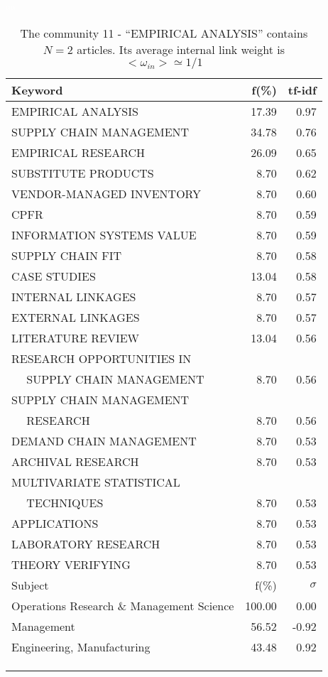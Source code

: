 \documentclass[a4paper,11pt]{report}
\begin{document}
\begin{landscape}
\begin{table}[!ht]
\caption{The community 11 - ``EMPIRICAL ANALYSIS'' contains $N = 2$ articles. Its average internal link weight is $<\omega_{in}> \simeq 1/1$ }
\textcolor{white}{aa}\\
{\scriptsize\begin{tabular}{|l r  r|}
\hline
Keyword & f(\%) & tf-idf \\
\hline
EMPIRICAL ANALYSIS & 17.39 & 0.97\\
SUPPLY CHAIN MANAGEMENT & 34.78 & 0.76\\
EMPIRICAL RESEARCH & 26.09 & 0.65\\
SUBSTITUTE PRODUCTS & 8.70 & 0.62\\
VENDOR-MANAGED INVENTORY & 8.70 & 0.60\\
CPFR & 8.70 & 0.59\\
INFORMATION SYSTEMS VALUE & 8.70 & 0.59\\
SUPPLY CHAIN FIT & 8.70 & 0.58\\
CASE STUDIES & 13.04 & 0.58\\
INTERNAL LINKAGES & 8.70 & 0.57\\
EXTERNAL LINKAGES & 8.70 & 0.57\\
LITERATURE REVIEW & 13.04 & 0.56\\
RESEARCH OPPORTUNITIES IN &  &\\
$\quad$ SUPPLY CHAIN MANAGEMENT & 8.70 & 0.56\\
SUPPLY CHAIN MANAGEMENT &  &\\
$\quad$ RESEARCH & 8.70 & 0.56\\
DEMAND CHAIN MANAGEMENT & 8.70 & 0.53\\
ARCHIVAL RESEARCH & 8.70 & 0.53\\
MULTIVARIATE STATISTICAL &  &\\
$\quad$ TECHNIQUES & 8.70 & 0.53\\
APPLICATIONS & 8.70 & 0.53\\
LABORATORY RESEARCH & 8.70 & 0.53\\
THEORY VERIFYING & 8.70 & 0.53\\
\hline
\hline
Subject & f(\%) & $\sigma$\\
\hline
Operations Research \& Management Science & 100.00 & 0.00\\
Management & 56.52 & -0.92\\
Engineering, Manufacturing & 43.48 & 0.92\\
 &  & \\
 &  & \\
 &  & \\

\end{tabular}}
\end{table}
\end{landscape}
\end{document}
